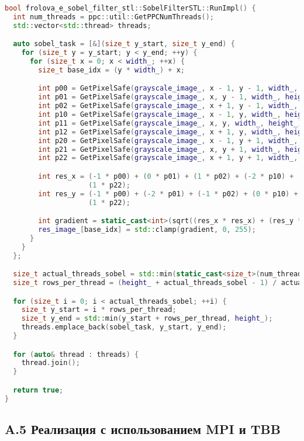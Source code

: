 \documentclass{report}
\begin{document}
\begin{lstlisting}[language=C++,caption={STL Thread Version}]
bool frolova_e_sobel_filter_stl::SobelFilterSTL::RunImpl() {
  int num_threads = ppc::util::GetPPCNumThreads();
  std::vector<std::thread> threads;

  auto sobel_task = [&](size_t y_start, size_t y_end) {
    for (size_t y = y_start; y < y_end; ++y) {
      for (size_t x = 0; x < width_; ++x) {
        size_t base_idx = (y * width_) + x;

        int p00 = GetPixelSafe(grayscale_image_, x - 1, y - 1, width_, height_);
        int p01 = GetPixelSafe(grayscale_image_, x, y - 1, width_, height_);
        int p02 = GetPixelSafe(grayscale_image_, x + 1, y - 1, width_, height_);
        int p10 = GetPixelSafe(grayscale_image_, x - 1, y, width_, height_);
        int p11 = GetPixelSafe(grayscale_image_, x, y, width_, height_);
        int p12 = GetPixelSafe(grayscale_image_, x + 1, y, width_, height_);
        int p20 = GetPixelSafe(grayscale_image_, x - 1, y + 1, width_, height_);
        int p21 = GetPixelSafe(grayscale_image_, x, y + 1, width_, height_);
        int p22 = GetPixelSafe(grayscale_image_, x + 1, y + 1, width_, height_);

        int res_x = (-1 * p00) + (0 * p01) + (1 * p02) + (-2 * p10) + (0 * p11) + (2 * p12) + (-1 * p20) + (0 * p21) +
                    (1 * p22);
        int res_y = (-1 * p00) + (-2 * p01) + (-1 * p02) + (0 * p10) + (0 * p11) + (0 * p12) + (1 * p20) + (2 * p21) +
                    (1 * p22);

        int gradient = static_cast<int>(sqrt((res_x * res_x) + (res_y * res_y)));
        res_image_[base_idx] = std::clamp(gradient, 0, 255);
      }
    }
  };

  size_t actual_threads_sobel = std::min(static_cast<size_t>(num_threads), height_);
  size_t rows_per_thread = (height_ + actual_threads_sobel - 1) / actual_threads_sobel;

  for (size_t i = 0; i < actual_threads_sobel; ++i) {
    size_t y_start = i * rows_per_thread;
    size_t y_end = std::min(y_start + rows_per_thread, height_);
    threads.emplace_back(sobel_task, y_start, y_end);
  }

  for (auto& thread : threads) {
    thread.join();
  }

  return true;
}
\end{lstlisting}

\subsection*{A.5 Реализация с использованием MPI и TBB}
\end{document}
